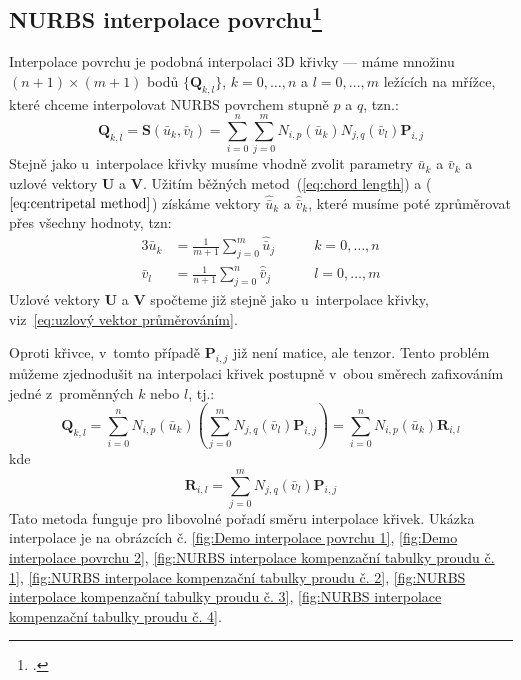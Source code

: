 \subsection[NURBS interpolace povrchu]{NURBS interpolace povrchu\footcite[kapitola 9.2.5]{The_NURBS_Book}}\label{sec:NURBS interpolace povrchu}
Interpolace povrchu je podobná interpolaci 3D křivky --- máme množinu $(n + 1)
    \times (m + 1)$ bodů $\{\bm{Q}_{k,l}\}$, $k=0,\ldots,n$ a $l=0,\ldots,m$ ležících na mřížce, které
chceme interpolovat NURBS povrchem stupně $p$ a $q$, tzn.:
\begin{equation}
    \bm{Q}_{k,l} = \bm{S}(\bar{u}_k, \bar{v}_l) = \sum_{i=0}^{n}\sum_{j=0}^{m}
    N_{i,p}(\bar{u}_k)N_{j,q}(\bar{v}_l)\bm{P}_{i,j}
\end{equation}
Stejně jako u~interpolace křivky musíme vhodně zvolit parametry $\bar{u}_k$ a $\bar{v}_k$
a uzlové vektory $\bm{U}$ a $\bm{V}$.
Užitím běžných metod~(\ref{eq:chord length}) a ($\ref{eq:centripetal method}$) získáme
vektory $\hat{\bar{u}}_k$ a $\hat{\bar{v}}_k$, které musíme poté
zprůměrovat přes všechny hodnoty, tzn:
\begin{alignat}{3}
    \bar{u}_k & = \frac{1}{m + 1}\sum_{j=0}^{m}\hat{\bar{u}}_j \quad\quad & k =0,\ldots,n \\
    \bar{v}_l & = \frac{1}{n + 1}\sum_{j=0}^{n}\hat{\bar{v}}_j\quad\quad  & l =0,\ldots,m
\end{alignat}
Uzlové vektory $\bm{U}$ a $\bm{V}$ spočteme již stejně jako u~interpolace křivky,
viz~\ref{eq:uzlový vektor průměrováním}.\par
Oproti křivce, v~tomto případě $\bm{P}_{i,j}$ již není matice, ale tenzor. Tento problém můžeme
zjednodušit na interpolaci křivek postupně v~obou směrech
zafixováním jedné z~proměnných $k$ nebo $l$, tj.:
\begin{equation}
    \bm{Q}_{k,l} =\sum_{i=0}^{n}N_{i,p}(\bar{u}_k)
    \left(\sum_{j=0}^{m}N_{j,q}(\bar{v}_l)\bm{P}_{i,j}\right)
    =\sum_{i=0}^{n}N_{i,p}(\bar{u}_k)\bm{R}_{i,l}
\end{equation}
kde \begin{equation}
    \bm{R}_{i,l} = \sum_{j=0}^{m}N_{j,q}(\bar{v}_l)\bm{P}_{i,j}
\end{equation}
Tato metoda funguje pro libovolné pořadí směru interpolace křivek.
Ukázka interpolace je na obrázcích č. \ref{fig:Demo interpolace povrchu 1}, \ref{fig:Demo interpolace povrchu 2},
\ref{fig:NURBS interpolace kompenzační tabulky proudu č. 1},
\ref{fig:NURBS interpolace kompenzační tabulky proudu č. 2},
\ref{fig:NURBS interpolace kompenzační tabulky proudu č. 3},
\ref{fig:NURBS interpolace kompenzační tabulky proudu č. 4}.

